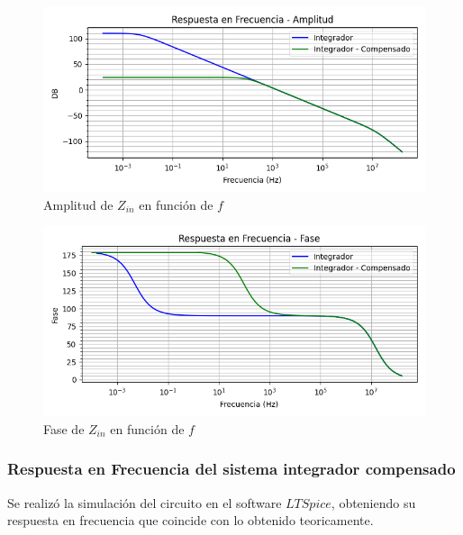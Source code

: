 \begin{figure}[H]
    \centering 
    \includegraphics [scale=1] {../Ejercicio3-CircuitoIntegradoresyDerivadores/Imagenes/diagrama-bode-integrador-compensado-comparativo-amplitud.png} 
    \caption{Amplitud de $Z_{in}$ en función de $f$}
    \label{fig:emptyPlotTool}
\end{figure}

\begin{figure}[H]
    \centering 
    \includegraphics [scale=1] {../Ejercicio3-CircuitoIntegradoresyDerivadores/Imagenes/diagrama-bode-integrador-compensado-comparativo-fase.png} 
    \caption{Fase de $Z_{in}$ en función de $f$ }
    \label{fig:emptyPlotTool}
\end{figure}

\subsubsection{Respuesta en Frecuencia del sistema integrador compensado}

Se realizó la simulación del circuito en el software $LTSpice$, obteniendo su respuesta en frecuencia que coincide con lo obtenido teoricamente.

